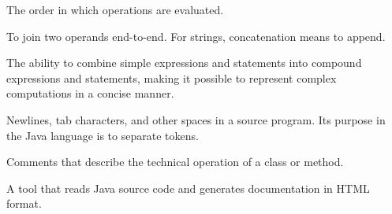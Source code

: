 \begin{description}
The order in which operations are evaluated.

To join two operands end-to-end.
For strings, concatenation means to append.

The ability to combine simple expressions and statements into compound expressions and statements, making it possible to represent complex computations in a concise manner.

Newlines, tab characters, and other spaces in a source program.
Its purpose in the Java language is to separate tokens.

Comments that describe the technical operation of a class or method.

A tool that reads Java source code and generates documentation in HTML format.

\end{description}
